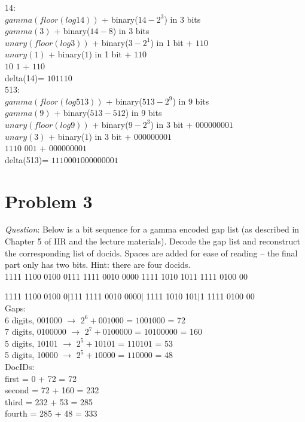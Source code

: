 \documentclass{article}
\begin{document}
14: \\
$gamma(floor(log 14))$ + binary($14-2^3$) in 3 bits \\
$gamma(3)$ + binary($14-8$) in 3 bits \\
$unary(floor(log 3))$ + binary($3-2^1$) in 1 bit + $110$ \\
$unary(1)$ + binary($1$) in 1 bit + $110$ \\
$10$ $1$ + $110$ \\
delta(14)= $101110$ \\

513: \\
$gamma(floor(log 513))$ + binary($513-2^9$) in 9 bits \\
$gamma(9)$ + binary($513-512$) in 9 bits \\
$unary(floor(log 9))$ + binary($9-2^3$) in 3 bit + $000000001$ \\
$unary(3)$ + binary($1$) in 3 bit + $000000001$ \\
$1110$ $001$ + $000000001$ \\
delta(513)= $1110001000000001$ \\



\section{Problem 3}
\noindent \textit{Question}: Below is a bit sequence for a gamma encoded gap list (as described in Chapter 5 of IIR and the lecture
materials). Decode the gap list and reconstruct the corresponding list of docids. Spaces are added for ease of reading --
the final part only has two bits. Hint: there are four docids.\\
1111 1100 0100 0111 1111 0010 0000 1111 1010 1011 1111 0100 00
\newline 

1111 1100 0100 0$|$111 1111 0010 0000$|$ 1111 1010 101$|$1 1111 0100 00 \\
Gaps: \\
6 digits, 001000 $\rightarrow$ $2^6 + 001000$ = $1001000$ = 72 \\
7 digits, 0100000 $\rightarrow$ $2^7 + 0100000$ = $10100000$ = 160 \\
5 digits, 10101 $\rightarrow$ $2^5 + 10101$ = $110101$ = 53 \\
5 digits, 10000 $\rightarrow$ $2^5 + 10000$ = $110000$ = 48 \\

\noindent DocIDs: \\
first = 0 + 72 = 72 \\
second = 72 + 160 = 232 \\ 
third = 232 + 53 = 285 \\
fourth = 285 + 48 = 333 \\
\end{document}
